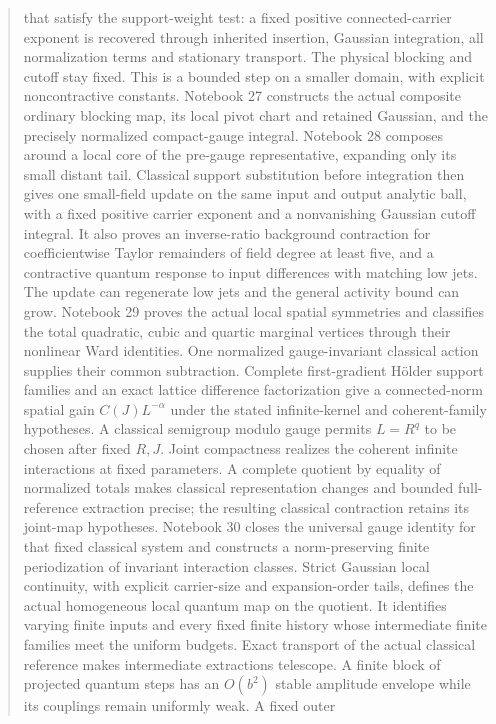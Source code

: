 \documentclass[11pt]{article}
\theoremstyle{remark}
\begin{document}
\begin{abstract}
that satisfy the support-weight test: a fixed positive
connected-carrier exponent is recovered through inherited
insertion, Gaussian integration, all normalization terms and
stationary transport. The physical blocking and cutoff stay
fixed. This is a bounded step on a smaller domain, with explicit
noncontractive constants. Notebook 27 constructs the actual
composite ordinary blocking map, its local pivot chart and
retained Gaussian, and the precisely normalized compact-gauge
integral. Notebook 28 composes around a local core of the
pre-gauge representative, expanding only its small distant tail.
Classical support substitution before integration then gives
one small-field update on the same input and output analytic
ball, with a fixed positive carrier exponent and a nonvanishing
Gaussian cutoff integral. It also proves an inverse-ratio
background contraction for coefficientwise Taylor remainders
of field degree at least five, and a contractive quantum
response to input differences with matching low jets.
The update can regenerate low jets and the general activity
bound can grow. Notebook 29 proves the actual local spatial
symmetries and classifies the total quadratic, cubic and
quartic marginal vertices through their nonlinear Ward
identities. One normalized gauge-invariant classical action
supplies their common subtraction. Complete first-gradient
H\"older support families and an exact lattice difference
factorization give a connected-norm spatial gain
\(C(J)L^{-\alpha}\) under the stated infinite-kernel and
coherent-family hypotheses. A classical semigroup modulo
gauge permits \(L=R^q\) to be chosen after fixed \(R,J\).
Joint compactness realizes the coherent infinite interactions
at fixed parameters. A complete quotient by equality of
normalized totals makes classical representation changes
and bounded full-reference extraction precise; the resulting
classical contraction retains its joint-map hypotheses.
Notebook 30 closes the universal gauge identity for that fixed
classical system and constructs a norm-preserving finite
periodization of invariant interaction classes. Strict Gaussian
local continuity, with explicit carrier-size and expansion-order
tails, defines the actual homogeneous local quantum map on the
quotient. It identifies varying finite inputs and every fixed
finite history whose intermediate finite families meet the
uniform budgets. Exact transport of the actual classical
reference makes intermediate extractions telescope. A finite
block of projected quantum steps has an \(O(b^2)\) stable amplitude
envelope while its couplings remain uniformly weak. A fixed outer

\end{abstract}
\end{document}
